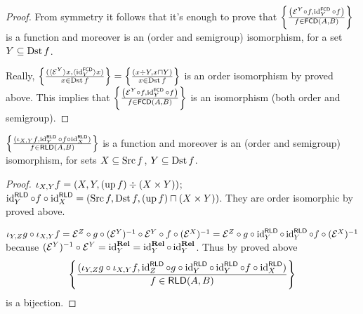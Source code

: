 \begin{proof}
  From symmetry it follows that it's enough to prove that $\left\{ \frac{ \left(
  \mathcal{E}^Y \circ f , \operatorname{id}^{\mathsf{FCD}}_Y \circ f \right)
  }{ f \in \mathsf{FCD} (A , B) }\right\}$ is a
  function and moreover is an (order and semigroup) isomorphism, for a set $Y
  \subseteq \operatorname{Dst} f$.
  
  Really, $\left\{ \frac{ (\langle \mathcal{E}^Y \rangle x , \langle
  \operatorname{id}^{\mathsf{FCD}}_Y \rangle x) }{ x
  \in \operatorname{Dst} f }\right\} = \left\{ \frac{ (x \div Y , x \sqcap Y) }{
  x \in \operatorname{Dst} f }\right\}$ is an order isomorphism by proved
  above. This implies that $\left\{ \frac{ \left( \mathcal{E}^Y \circ f ,
  \operatorname{id}^{\mathsf{FCD}}_Y \circ f \right) }{
  f \in \mathsf{FCD} (A , B) }\right\}$ is an isomorphism
  (both order and semigroup).
\end{proof}

\begin{prop}
  $\left\{ \frac{ (\iota_{X, Y} f , \operatorname{id}^{\mathsf{RLD}}_Y \circ f \circ
  \operatorname{id}^{\mathsf{RLD}}_X) }{ f \in
  \mathsf{RLD} (A , B) }\right\}$ is a function and moreover is an
  (order and semigroup) isomorphism, for sets $X \subseteq \operatorname{Src} f$, $Y
  \subseteq \operatorname{Dst} f$.
\end{prop}

\begin{proof}
  $\iota_{X, Y} f = (X , Y , (\operatorname{up} f) \div (X \times Y))$;
  $\operatorname{id}^{\mathsf{RLD}}_Y \circ f \circ
  \operatorname{id}^{\mathsf{RLD}}_X = (\operatorname{Src} f , \operatorname{Dst} f ,
  (\operatorname{up} f) \sqcap (X \times Y))$. They are order isomorphic by proved
  above.
  
  $\iota_{Y, Z} g \circ \iota_{X, Y} f =\mathcal{E}^Z \circ g \circ
  (\mathcal{E}^Y)^{- 1} \circ \mathcal{E}^Y \circ f \circ (\mathcal{E}^X)^{-
  1} =\mathcal{E}^Z \circ g \circ \operatorname{id}^{\mathsf{RLD}}_Y \circ
  \operatorname{id}^{\mathsf{RLD}}_Y \circ f \circ (\mathcal{E}^X)^{- 1}$
  because $(\mathcal{E}^Y)^{- 1} \circ \mathcal{E}^Y =
  \operatorname{id}^{\mathbf{Rel}}_Y = \operatorname{id}^{\mathbf{Rel}}_Y
  \circ \operatorname{id}^{\mathbf{Rel}}_Y$. Thus by proved above
  \[ \left\{ \frac{ (\iota_{Y, Z} g \circ \iota_{X, Y} f ,
     \operatorname{id}^{\mathsf{RLD}}_Z \circ g \circ
     \operatorname{id}^{\mathsf{RLD}}_Y \circ \operatorname{id}^{\mathsf{RLD}}_Y
     \circ f \circ \operatorname{id}^{\mathsf{RLD}}_X) }{
     f \in \mathsf{RLD} (A , B) }\right\} \]
  is a bijection.
\end{proof}

